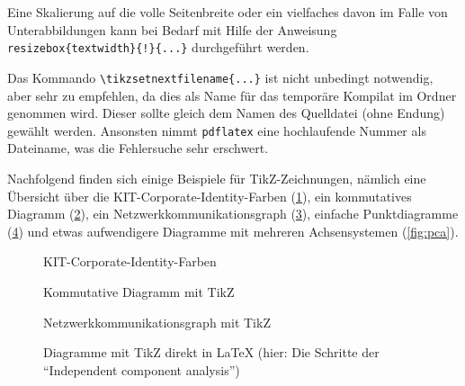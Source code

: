 Eine Skalierung auf die volle Seitenbreite oder ein vielfaches davon im Falle von Unterabbildungen kann bei Bedarf mit Hilfe der Anweisung
\texttt{\bs resizebox\{\bs textwidth\}\{!\}\{...\}}
durchgeführt werden.

Das Kommando \verb+\tikzsetnextfilename{...}+ ist nicht unbedingt notwendig,
 aber sehr zu empfehlen, da dies als Name für das temporäre Kompilat im Ordner
 genommen wird.
Dieser sollte gleich dem Namen des Quelldatei (ohne Endung) gewählt werden.
Ansonsten nimmt \texttt{pdflatex} eine hochlaufende Nummer als Dateiname,
was die Fehlersuche sehr erschwert.

Nachfolgend finden sich einige Beispiele für TikZ-Zeichnungen, nämlich
eine Übersicht über die KIT-Corporate-Identity-Farben (\cref{fig:kit-colors}),
ein kommutatives Diagramm (\cref{fig:kpca}),
ein Netzwerkkommunikationsgraph (\cref{fig:net-comm}),
einfache Punktdiagramme (\cref{fig:ica})
und etwas aufwendigere Diagramme mit mehreren
Achsensystemen (\cref{fig:pca}).

\begin{figure}[hp]%
	\centering%
	\caption{KIT-Corporate-Identity-Farben}%
  \label{fig:kit-colors}%
\end{figure}

\begin{figure}[hp]%
	\centering%
	\caption{Kommutative Diagramm mit TikZ}%
  \label{fig:kpca}%
\end{figure}

\begin{figure}[hp]%
	\centering
	\resizebox{\textwidth}{!}{%
	}%
	\caption{Netzwerkkommunikationsgraph mit TikZ}%
  \label{fig:net-comm}%
\end{figure}

\begin{figure}[hp]%
	\centering%
	\hfill%
	\hfill%
\caption{Diagramme mit TikZ direkt in LaTeX (hier: Die Schritte der \enquote{Independent component analysis})}%
\label{fig:ica}%
\end{figure}

